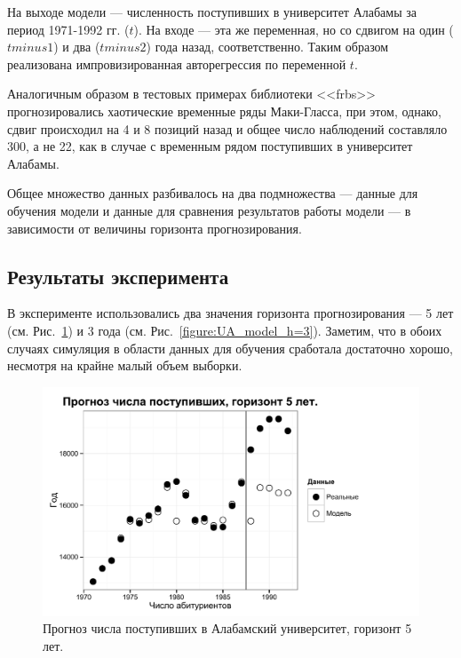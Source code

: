 На выходе модели --- численность поступивших в университет Алабамы за период 1971-1992 гг. ($t$). На входе --- эта же переменная, но со сдвигом на один ($tminus1$) и два ($tminus2$) года назад, соответственно. Таким образом реализована импровизированная авторегрессия по переменной $t$. 

Аналогичным образом в тестовых примерах библиотеки <<frbs>> прогнозировались хаотические временные ряды Маки-Гласса, при этом, однако, сдвиг происходил на 4 и 8 позиций назад и общее число наблюдений составляло 300, а не 22, как в случае с временным рядом поступивших в университет Алабамы.

Общее множество данных разбивалось на два подмножества --- данные для обучения модели и данные для сравнения результатов работы модели --- в зависимости от величины горизонта прогнозирования. 

\subsection{Результаты эксперимента}

В эксперименте использовались два значения горизонта прогнозирования --- 5 лет (см. Рис.~\ref{figure:UA_model_h=5}) и 3 года (см. Рис.~\ref{figure:UA_model_h=3}). Заметим, что в обоих случаях симуляция в области данных для обучения сработала достаточно хорошо, несмотря на крайне малый объем выборки. 

\begin{figure}[bhtp]
	\begin{center}
		\includegraphics{images/UA_model_h=5.pdf}
		\caption{Прогноз числа поступивших в Алабамский университет, \newline горизонт 5 лет.}		
		\label{figure:UA_model_h=5}
	\end{center}
\end{figure}

